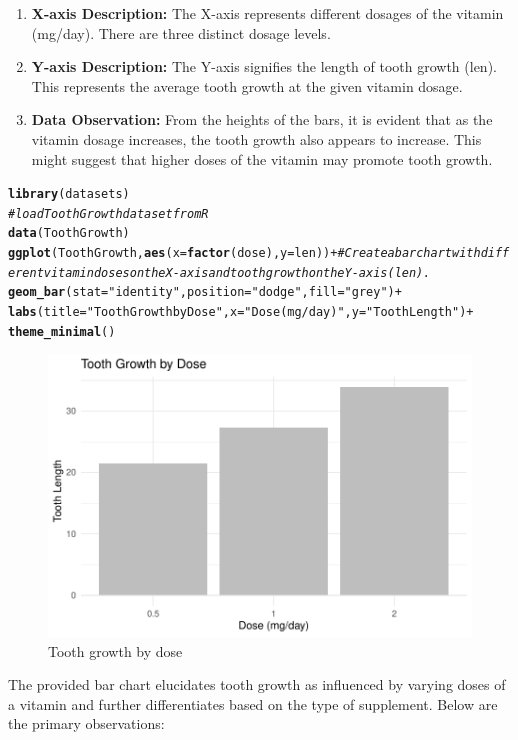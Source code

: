 \documentclass{article}\usepackage[]{graphicx}\usepackage[]{xcolor}
\makeatletter
\def\maxwidth{ %
  \ifdim\Gin@nat@width>\linewidth
    \linewidth
  \else
    \Gin@nat@width
  \fi
}
\newcommand{\hlstr}[1]{\textcolor[rgb]{0.192,0.494,0.8}{#1}}%
\newcommand{\hlcom}[1]{\textcolor[rgb]{0.678,0.584,0.686}{\textit{#1}}}%
\newcommand{\hlopt}[1]{\textcolor[rgb]{0,0,0}{#1}}%
\newcommand{\hlstd}[1]{\textcolor[rgb]{0.345,0.345,0.345}{#1}}%
\newcommand{\hlkwc}[1]{\textcolor[rgb]{0.333,0.667,0.333}{#1}}%
\newcommand{\hlkwd}[1]{\textcolor[rgb]{0.737,0.353,0.396}{\textbf{#1}}}%
\newenvironment{kframe}{%
 \def\at@end@of@kframe{}%
 \ifinner\ifhmode%
  \def\at@end@of@kframe{\end{minipage}}%
  \begin{minipage}{\columnwidth}%
 \fi\fi%
 \def\FrameCommand##1{\hskip\@totalleftmargin \hskip-\fboxsep
 \colorbox{shadecolor}{##1}\hskip-\fboxsep
     \hskip-\linewidth \hskip-\@totalleftmargin \hskip\columnwidth}%
 \MakeFramed {\advance\hsize-\width
   \@totalleftmargin\z@ \linewidth\hsize
   \@setminipage}}%
 {\par\unskip\endMakeFramed%
 \at@end@of@kframe}
\newenvironment{knitrout}{}{} %
\makeatother
\begin{document}
\begin{enumerate}
    \item \textbf{X-axis Description:} The X-axis represents different dosages of the vitamin (mg/day). There are three distinct dosage levels.
    
    \item \textbf{Y-axis Description:} The Y-axis signifies the length of tooth growth (len). This represents the average tooth growth at the given vitamin dosage.
    \item \textbf{Data Observation:} From the heights of the bars, it is evident that as the vitamin dosage increases, the tooth growth also appears to increase. This might suggest that higher doses of the vitamin may promote tooth growth.
\end{enumerate}
\begin{knitrout}
\color{fgcolor}\begin{kframe}
\begin{alltt}
\hlkwd{library}\hlstd{(datasets)}
\hlcom{# load ToothGrowth dataset from R}
\hlkwd{data}\hlstd{(ToothGrowth)}
\hlkwd{ggplot}\hlstd{(ToothGrowth,} \hlkwd{aes}\hlstd{(}\hlkwc{x} \hlstd{=} \hlkwd{factor}\hlstd{(dose),} \hlkwc{y} \hlstd{= len))} \hlopt{+}\hlcom{# Create a bar chart with different vitamin doses on the X-axis and tooth growth on the Y-axis (len).}
  \hlkwd{geom_bar}\hlstd{(}\hlkwc{stat} \hlstd{=} \hlstr{"identity"}\hlstd{,} \hlkwc{position} \hlstd{=} \hlstr{"dodge"}\hlstd{,} \hlkwc{fill} \hlstd{=} \hlstr{"grey"}\hlstd{)} \hlopt{+}
  \hlkwd{labs}\hlstd{(}\hlkwc{title} \hlstd{=} \hlstr{"Tooth Growth by Dose"}\hlstd{,} \hlkwc{x} \hlstd{=} \hlstr{"Dose (mg/day)"}\hlstd{,} \hlkwc{y} \hlstd{=} \hlstr{"Tooth Length"}\hlstd{)} \hlopt{+}
  \hlkwd{theme_minimal}\hlstd{()}
\end{alltt}
\end{kframe}\begin{figure}
\includegraphics[width=\maxwidth]{figure/barchart1-1} \caption[Tooth growth by dose]{Tooth growth by dose}\label{fig:barchart1}
\end{figure}

\end{knitrout}
The provided bar chart elucidates tooth growth as influenced by varying doses of a vitamin and further differentiates based on the type of supplement. Below are the primary observations:
\end{document}
